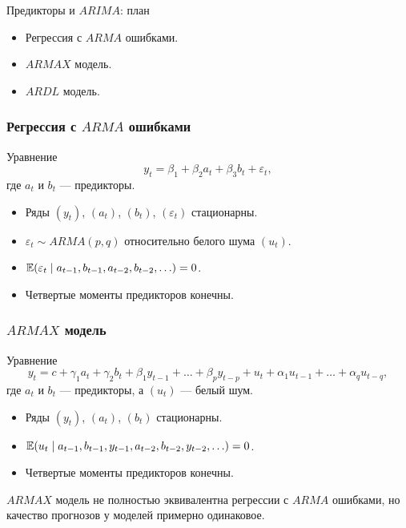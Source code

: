 
\begin{frame} %


\end{frame}

\begin{frame}{Предикторы и $ARIMA$: план}
  \begin{itemize}[<+->]
    \item Регрессия с \alert{$ARMA$ ошибками}.
    \item \alert{$ARMAX$ модель}.
    \item \alert{$ARDL$ модель}.
  \end{itemize}
\end{frame}

\begin{frame}
  \frametitle{Регрессия с $ARMA$ ошибками}
  
  \begin{block}{Уравнение}
    \[
      y_t = \beta_1 + \beta_2 a_t + \beta_3 b_t + \varepsilon_t,
    \]
  где $a_t$ и $b_t$ — \alert{предикторы}.
  \end{block}
  \pause
  \begin{itemize}
  \item Ряды $(y_t)$, $(a_t)$, $(b_t)$, $(\varepsilon_t)$ \alert{стационарны}.
  \item $\varepsilon_t \sim ARMA(p, q)$ относительно белого шума $(u_t)$.
\item $\mathbb{E}(\varepsilon_t \mid a_{t-1}, b_{t-1}, a_{t-2}, b_{t-2}, \ldots) = 0$.
\item \alert{Четвертые моменты} предикторов конечны.  
\end{itemize}
  
\end{frame}


\begin{frame}
  \frametitle{$ARMAX$ модель}

  \begin{block}{Уравнение}
    \[
      y_t = c + \gamma_1 a_t + \gamma_2 b_t + \beta_1 y_{t-1} + \ldots + \beta_p y_{t-p} + u_t + \alpha_1 u_{t-1} + \ldots + \alpha_q u_{t-q},
    \]
  где $a_t$ и $b_t$ — \alert{предикторы}, а $(u_t)$ — \alert{белый шум}.
  \end{block}
\pause
  \begin{itemize}[<+->]
  \item Ряды $(y_t)$, $(a_t)$, $(b_t)$ \alert{стационарны}.
\item $\mathbb{E}(u_t \mid a_{t-1}, b_{t-1}, y_{t-1}, a_{t-2}, b_{t-2}, y_{t-2}, \ldots) = 0$.
\item \alert{Четвертые моменты предикторов} конечны.  
\end{itemize}
  \pause
  $ARMAX$ модель не полностью эквивалентна регрессии с $ARMA$ ошибками, но качество прогнозов у моделей \alert{примерно одинаковое}.  

\end{frame}



